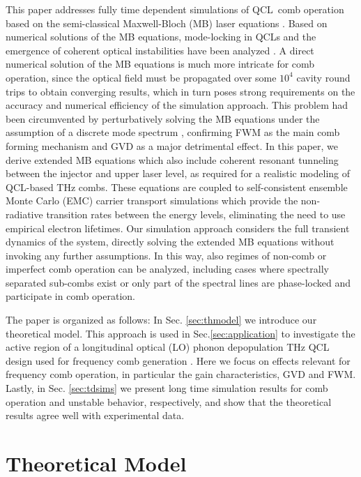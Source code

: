 \documentclass[10pt,letterpaper]{article}%
\begin{document}
This paper addresses fully time dependent simulations of QCL\ comb operation
based on the semi-classical Maxwell-Bloch (MB) laser equations
\cite{boyd2003nonlinear}. Based on numerical solutions of the MB equations,
mode-locking in QCLs and the emergence of coherent optical instabilities have
been analyzed
\cite{wang2007coherent,gordon2008multimode,gkortsas2010dynamics,talukder2010self,wang2015active,vukovic2016multimode}%
. A direct numerical solution of the MB equations is much more intricate for
comb operation, since the optical field must be propagated over some $10^{4}$
cavity round trips to obtain converging results, which in turn poses strong
requirements on the accuracy and numerical efficiency of the simulation
approach. This problem had been circumvented by perturbatively solving the MB
equations under the assumption of a discrete mode spectrum
\cite{khurgin2014coherent,villares2015quantum}, confirming FWM as the main
comb forming mechanism and GVD as a major detrimental effect. In this paper,
we derive extended MB equations which also include coherent resonant tunneling
between the injector and upper laser level, as required for a realistic
modeling of QCL-based THz combs. These equations are coupled to
self-consistent ensemble Monte Carlo (EMC) carrier transport simulations which
provide the non-radiative transition rates between the energy levels,
eliminating the need to use empirical electron lifetimes. Our simulation
approach considers the full transient dynamics of the system, directly solving
the extended MB equations without invoking any further assumptions. In this
way, also regimes of non-comb or imperfect comb operation can be analyzed,
including cases where spectrally separated sub-combs exist or only part of the
spectral lines are phase-locked and participate in comb operation.

The paper is organized as follows: In Sec. \ref{sec:thmodel} we introduce our
theoretical model. This approach is used in Sec.\ref{sec:application} to
investigate the active region of a longitudinal optical (LO) phonon
depopulation THz QCL design used for frequency comb generation
\cite{burghoff2014terahertz}. Here we focus on effects relevant for frequency
comb operation, in particular the gain characteristics, GVD and FWM. Lastly,
in Sec. \ref{sec:tdsims} we present long time simulation results for comb
operation and unstable behavior, respectively, and show that the theoretical
results agree well with experimental data.

\section{Theoretical Model}
\end{document}
